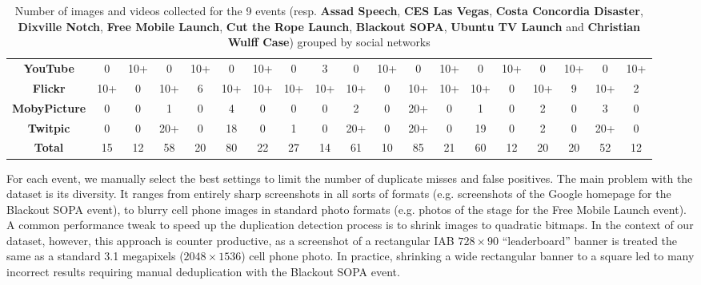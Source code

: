 \documentclass{acm_proc_article-sp}
\begin{document}
\begin{table}[htbp]
{{\begin{tabular}{|c|c|c|c|c|c|c|c|c|c|c|c|c|c|c|c|c|c|c|}
    \textbf{YouTube} & 0 & 10+ & 0 & 10+ & 0 & 10+ & 0 & 3 & 0 & 10+ & 0 & 10+ & 0 & 10+ & 0 & 10+ & 0 & 10+\\
    \textbf{Flickr} & 10+ & 0 & 10+ & 6 & 10+ & 10+ & 10+ & 10+ & 10+ & 0 & 10+ & 10+ & 10+ & 0 & 10+ & 9 & 10+ & 2\\
    \textbf{MobyPicture} & 0 & 0 & 1 & 0 & 4 & 0 & 0 & 0 & 2 & 0 & 20+ & 0 & 1 & 0 & 2 & 0 & 3 & 0\\
    \textbf{Twitpic} & 0 & 0 & 20+ & 0 & 18 & 0 & 1 & 0 & 20+ & 0 & 20+ & 0 & 19 & 0 & 2 & 0 & 20+ & 0\\
    \hline
    \textbf{Total} & 15 & 12 & 58 & 20 & 80 & 22 & 27 & 14 & 61 & 10 & 85 & 21 & 60 & 12 & 20 & 20 & 52 & 12\\
    \hline
  \end{tabular}
  }
  \label{tab:number-media}
  \caption{Number of images and videos collected for the 9 events (resp. \textbf{Assad Speech}, \textbf{CES Las Vegas}, \textbf{Costa Concordia Disaster}, \textbf{Dixville Notch}, \textbf{Free Mobile Launch}, \textbf{Cut the Rope Launch}, \textbf{Blackout SOPA}, \textbf{Ubuntu TV Launch} and \textbf{Christian Wulff Case}) grouped by social networks}
  }
\end{table}
For each event, we manually select the best settings to limit the number of duplicate misses and false positives. The main problem with the dataset is its diversity. It ranges from entirely sharp screenshots in all sorts of formats (e.g. screenshots of the Google homepage for the Blackout SOPA event), to blurry cell phone images in standard photo formats (e.g. photos of the stage for the Free Mobile Launch event). A common performance tweak to speed up the duplication detection process is to shrink images to quadratic bitmaps. In the context of our dataset, however, this approach is counter productive, as a screenshot of a rectangular IAB $728 \times 90$ ``leaderboard'' banner is treated the same as a standard 3.1 megapixels ($2048 \times 1536$) cell phone photo. In practice, shrinking a wide rectangular banner to a square led to many incorrect results requiring manual deduplication with the Blackout SOPA event.
\end{document}
